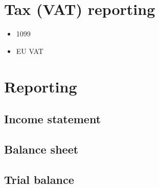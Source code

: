 \section{Tax (VAT) reporting}

\begin{itemize}
\item 1099
\item EU VAT
\end{itemize}


\section{Reporting}
\subsection{Income statement}
\subsection{Balance sheet}
\subsection{Trial balance}


